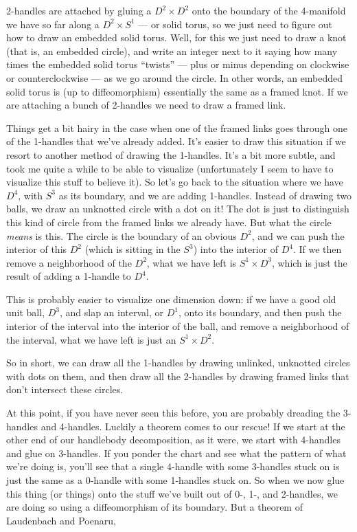 \documentclass{article}
\begin{document}
2-handles are attached by gluing a \(D^2 \times D^2\) onto the boundary
of the 4-manifold we have so far along a \(D^2 \times S^1\) --- or solid
torus, so we just need to figure out how to draw an embedded solid
torus. Well, for this we just need to draw a knot (that is, an embedded
circle), and write an integer next to it saying how many times the
embedded solid torus ``twists'' --- plus or minus depending on clockwise
or counterclockwise --- as we go around the circle. In other words, an
embedded solid torus is (up to diffeomorphism) essentially the same as a
framed knot. If we are attaching a bunch of 2-handles we need to draw a
framed link.

Things get a bit hairy in the case when one of the framed links goes
through one of the 1-handles that we've already added. It's easier to
draw this situation if we resort to another method of drawing the
1-handles. It's a bit more subtle, and took me quite a while to be able
to visualize (unfortunately I seem to have to visualize this stuff to
believe it). So let's go back to the situation where we have \(D^4\),
with \(S^3\) as its boundary, and we are adding 1-handles. Instead of
drawing two balls, we draw an unknotted circle with a dot on it! The dot
is just to distinguish this kind of circle from the framed links we
already have. But what the circle \emph{means} is this. The circle is
the boundary of an obvious \(D^2\), and we can push the interior of this
\(D^2\) (which is sitting in the \(S^3\)) into the interior of \(D^4\).
If we then remove a neighborhood of the \(D^2\), what we have left is
\(S^1 \times D^3\), which is just the result of adding a 1-handle to
\(D^4\).

This is probably easier to visualize one dimension down: if we have a
good old unit ball, \(D^3\), and slap an interval, or \(D^1\), onto its
boundary, and then push the interior of the interval into the interior
of the ball, and remove a neighborhood of the interval, what we have
left is just an \(S^1 \times D^2\).

So in short, we can draw all the 1-handles by drawing unlinked,
unknotted circles with dots on them, and then draw all the 2-handles by
drawing framed links that don't intersect these circles.

At this point, if you have never seen this before, you are probably
dreading the 3-handles and 4-handles. Luckily a theorem comes to our
rescue! If we start at the other end of our handlebody decomposition, as
it were, we start with 4-handles and glue on 3-handles. If you ponder
the chart and see what the pattern of what we're doing is, you'll see
that a single 4-handle with some 3-handles stuck on is just the same as
a 0-handle with some 1-handles stuck on. So when we now glue this thing
(or things) onto the stuff we've built out of 0-, 1-, and 2-handles, we
are doing so using a diffeomorphism of its boundary. But a theorem of
Laudenbach and Poenaru,
\end{document}
